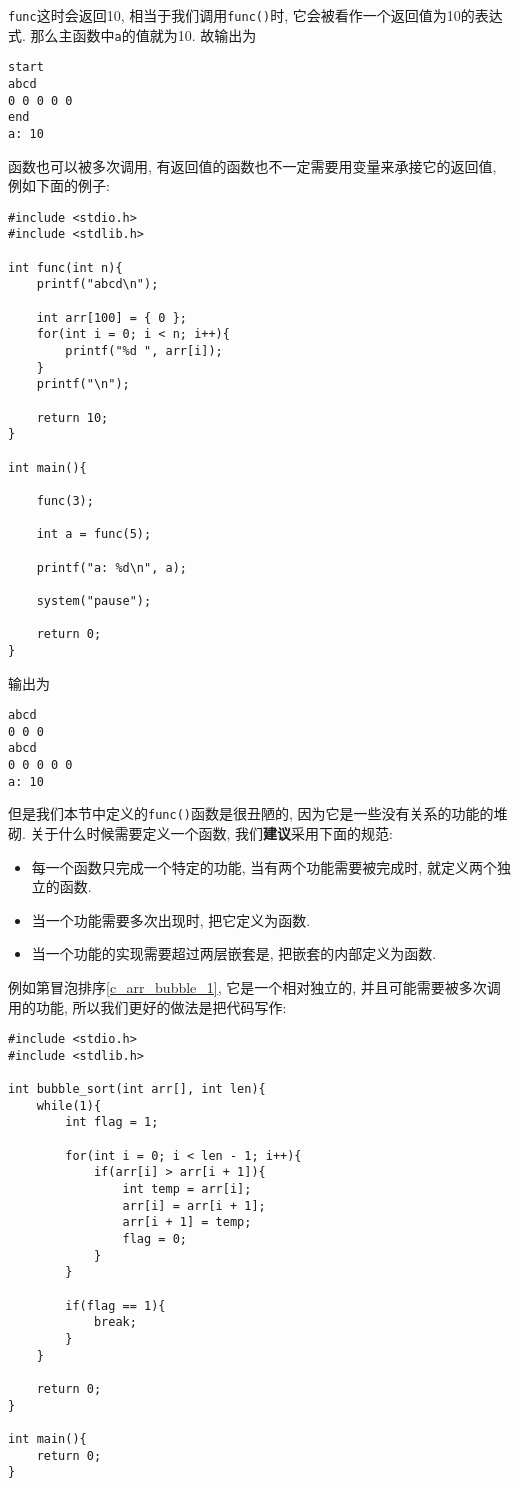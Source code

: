         \texttt{func}这时会返回10, 相当于我们调用\texttt{func()}时, 它会被看作一个返回值为10的表达式. 那么主函数中\texttt{a}的值就为10. 故输出为
\begin{lstlisting}
start
abcd
0 0 0 0 0
end
a: 10
\end{lstlisting}

        函数也可以被多次调用, 有返回值的函数也不一定需要用变量来承接它的返回值, 例如下面的例子:
\begin{lstlisting}
#include <stdio.h>
#include <stdlib.h>

int func(int n){
    printf("abcd\n");

    int arr[100] = { 0 };
    for(int i = 0; i < n; i++){
        printf("%d ", arr[i]);
    }
    printf("\n");

    return 10;
}

int main(){

    func(3);

    int a = func(5);

    printf("a: %d\n", a);

    system("pause");

    return 0;
}
\end{lstlisting}

        输出为
\begin{lstlisting}
abcd
0 0 0
abcd
0 0 0 0 0
a: 10
\end{lstlisting}

        但是我们本节中定义的\texttt{func()}函数是很丑陋的, 因为它是一些没有关系的功能的堆砌. 关于什么时候需要定义一个函数, 我们\textbf{建议}采用下面的规范:
        \begin{itemize}
            \item 每一个函数只完成一个特定的功能, 当有两个功能需要被完成时, 就定义两个独立的函数.
            \item 当一个功能需要多次出现时, 把它定义为函数.
            \item 当一个功能的实现需要超过两层嵌套是, 把嵌套的内部定义为函数.
        \end{itemize}

        例如第冒泡排序\ref{c_arr_bubble_1}, 它是一个相对独立的, 并且可能需要被多次调用的功能, 所以我们更好的做法是把代码写作:
\begin{lstlisting}
#include <stdio.h>
#include <stdlib.h>

int bubble_sort(int arr[], int len){
    while(1){
        int flag = 1;

        for(int i = 0; i < len - 1; i++){
            if(arr[i] > arr[i + 1]){
                int temp = arr[i];
                arr[i] = arr[i + 1];
                arr[i + 1] = temp;
                flag = 0;
            }
        }

        if(flag == 1){
            break;
        }
    }

    return 0;
}

int main(){
    return 0;
}
\end{lstlisting}

